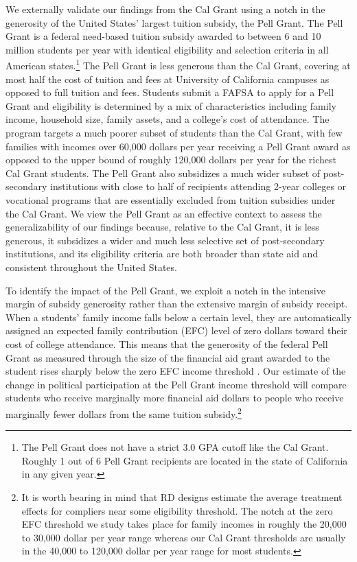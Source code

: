\documentclass[12pt,letterpaper,oneside]{book}
\begin{document}
We externally validate our findings from the Cal Grant using a notch in the generosity of the United States' largest tuition subsidy, the Pell Grant. The Pell Grant is a federal need-based tuition subsidy awarded to between 6 and 10 million students per year with identical eligibility and selection criteria in all American states.\footnote{The Pell Grant does not have a strict 3.0 GPA cutoff like the Cal Grant. Roughly 1 out of 6 Pell Grant recipients are located in the state of California in any given year.} The Pell Grant is less generous than the Cal Grant, covering at most half the cost of tuition and fees at University of California campuses as opposed to full tuition and fees. Students submit a FAFSA to apply for a Pell Grant and eligibility is determined by a mix of characteristics including family income, household size, family assets, and a college's cost of attendance. The program targets a much poorer subset of students than the Cal Grant, with few families with incomes over 60,000 dollars per year receiving a Pell Grant award as opposed to the upper bound of roughly 120,000 dollars per year for the richest Cal Grant students. The Pell Grant also subsidizes a much wider subset of post-secondary institutions with close to half of recipients attending 2-year colleges or vocational programs that are essentially excluded from tuition subsidies under the Cal Grant. We view the Pell Grant as an effective context to assess the generalizability of our findings because, relative to the Cal Grant, it is less generous, it subsidizes a wider and much less selective set of post-secondary institutions, and its eligibility criteria are both broader than state aid and consistent throughout the United States.

To identify the impact of the Pell Grant, we exploit a notch in the intensive margin of subsidy generosity rather than the extensive margin of subsidy receipt. When a students' family income falls below a certain level, they are automatically assigned an expected family contribution (EFC) level of zero dollars toward their cost of college attendance. This means that the generosity of the federal Pell Grant as measured through the size of the financial aid grant awarded to the student rises sharply below the zero EFC income threshold \citep{denning_propelled:_2019}. Our estimate of the change in political participation at the Pell Grant income threshold will compare students who receive marginally more financial aid dollars to people who receive marginally fewer dollars from the same tuition subsidy.\footnote{It is worth bearing in mind that RD designs estimate the average treatment effects for compliers near some eligibility threshold. The notch at the zero EFC threshold we study takes place for family incomes in roughly the 20,000 to 30,000 dollar per year range whereas our Cal Grant thresholds are usually in the 40,000 to 120,000 dollar per year range for most students.}
\end{document}
